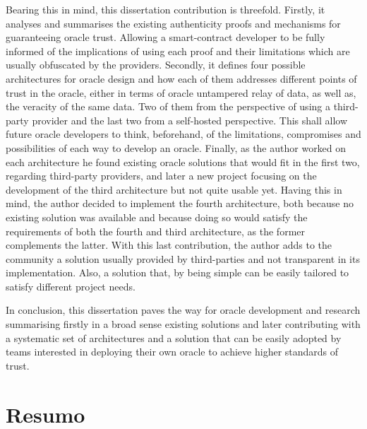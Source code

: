Bearing this in mind, this dissertation contribution is threefold. Firstly, it analyses and summarises the existing authenticity proofs and mechanisms for guaranteeing oracle trust. Allowing a smart-contract developer to be fully informed of the implications of using each proof and their limitations which are usually obfuscated by the providers. Secondly, it defines four possible architectures for oracle design and how each of them addresses different points of trust in the oracle, either in terms of oracle untampered relay of data, as well as, the veracity of the same data. Two of them from the perspective of using a third-party provider and the last two from a self-hosted perspective. This shall allow future oracle developers to think, beforehand, of the limitations, compromises and possibilities of each way to develop an oracle. Finally, as the author worked on each architecture he found existing oracle solutions that would fit in the first two, regarding third-party providers, and later a new project focusing on the development of the third architecture but not quite usable yet. Having this in mind, the author decided to implement the fourth architecture, both because no existing solution was available and because doing so would satisfy the requirements of both the fourth and third architecture, as the former complements the latter. With this last contribution, the author adds to the community a solution usually provided by third-parties and not transparent in its implementation. Also, a solution that, by being simple can be easily tailored to satisfy different project needs.

In conclusion, this dissertation paves the way for oracle development and research summarising firstly in a broad sense existing solutions and later contributing with a systematic set of architectures and a solution that can be easily adopted by teams interested in deploying their own oracle to achieve higher standards of trust.


\chapter*{Resumo}





